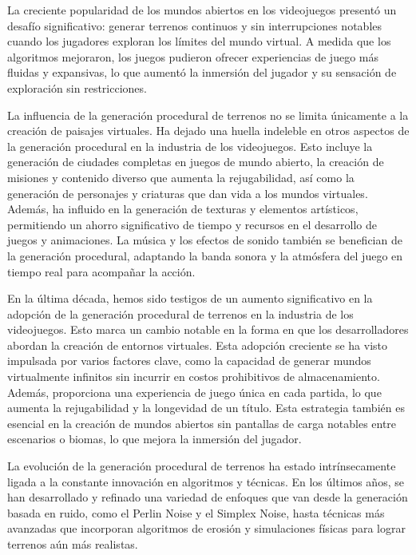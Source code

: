La creciente popularidad de los mundos abiertos en los videojuegos presentó un desafío significativo: generar terrenos continuos y sin interrupciones notables cuando los jugadores exploran los límites del mundo virtual. A medida que los algoritmos mejoraron, los juegos pudieron ofrecer experiencias de juego más fluidas y expansivas, lo que aumentó la inmersión del jugador y su sensación de exploración sin restricciones.

La influencia de la generación procedural de terrenos no se limita únicamente a la creación de paisajes virtuales. Ha dejado una huella indeleble en otros aspectos de la generación procedural en la industria de los videojuegos. Esto incluye la generación de ciudades completas en juegos de mundo abierto, la creación de misiones y contenido diverso que aumenta la rejugabilidad, así como la generación de personajes y criaturas que dan vida a los mundos virtuales. Además, ha influido en la generación de texturas y elementos artísticos, permitiendo un ahorro significativo de tiempo y recursos en el desarrollo de juegos y animaciones. La música y los efectos de sonido también se benefician de la generación procedural, adaptando la banda sonora y la atmósfera del juego en tiempo real para acompañar la acción.

En la última década, hemos sido testigos de un aumento significativo en la adopción de la generación procedural de terrenos en la industria de los videojuegos. Esto marca un cambio notable en la forma en que los desarrolladores abordan la creación de entornos virtuales. Esta adopción creciente se ha visto impulsada por varios factores clave, como la capacidad de generar mundos virtualmente infinitos sin incurrir en costos prohibitivos de almacenamiento. Además, proporciona una experiencia de juego única en cada partida, lo que aumenta la rejugabilidad y la longevidad de un título. Esta estrategia también es esencial en la creación de mundos abiertos sin pantallas de carga notables entre escenarios o biomas, lo que mejora la inmersión del jugador.

La evolución de la generación procedural de terrenos ha estado intrínsecamente ligada a la constante innovación en algoritmos y técnicas. En los últimos años, se han desarrollado y refinado una variedad de enfoques que van desde la generación basada en ruido, como el Perlin Noise y el Simplex Noise, hasta técnicas más avanzadas que incorporan algoritmos de erosión y simulaciones físicas para lograr terrenos aún más realistas.

